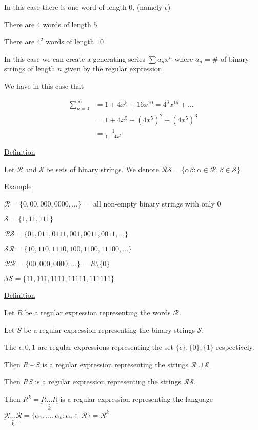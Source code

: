 \documentclass{article}
\newcommand\mc{\mathcal}
\begin{document}
In this case there is one word of length $0$, (namely $\epsilon$)

There are $4$ words of length $5$

There are $4^2$ words of length $10$

In this case we can create a generating series $\sum{}{}a_nx^n$ where $a_n = \#$ of binary strings of length $n$ given by the regular expression.

We have in this case that

\begin{align*}
    \sum_{n=0}^{\infty} &= 1 + 4x^5 + 16x^{10} = 4^3x^{15} + \ldots \\
    &= 1 + 4x^5 + (4x^5)^2 + (4x^5)^3 \\
    &= \frac{1}{1-4x^5}
\end{align*}

\underline{Definition}

Let $\mc{R}$ and $\mc{S}$ be sets of binary strings. We denote $\mc{RS} = \{\alpha\beta : \alpha \in \mc{R}, \beta \in \mc{S}\}$

\underline{Example}

$\mc{R} = \{0,00,000,0000,\ldots\} = $ all non-empty binary strings with only $0$

$\mc{S} = \{1,11,111\}$

$\mc{RS} = \{01,011,0111,001,0011,0011,\ldots\}$

$\mc{SR} = \{10,110,1110,100,1100,11100,\ldots\}$

$\mc{RR} = \{00,000,0000,\ldots\} = R \setminus \{0\}$

$\mc{SS} = \{11,111,1111,11111,111111\}$

\underline{Definition}

Let $R$ be a regular expression representing the words $\mc{R}$. 

Let $S$ be a regular expression representing the binary strings $\mc{S}$.

The $\epsilon, 0, 1$ are regular expressions representing the set $\{\epsilon\}, \{0\},\{1\}$ respectively. 

Then $R \smile S$ is a regular expression representing the strings $\mc{R} \cup \mc{S}$. 

Then $RS$ is a regular expression representing the strings $\mc{RS}$. 

Then $R^k = \underbrace{R...R}_{k}$ is a regular expression representing the language $\underbrace{\mc{R}\ldots\mc{R}}_{k} = \{\alpha_1, \ldots, \alpha_k : \alpha_i \in \mc{R}\} = \mc{R}^k$
\end{document}
